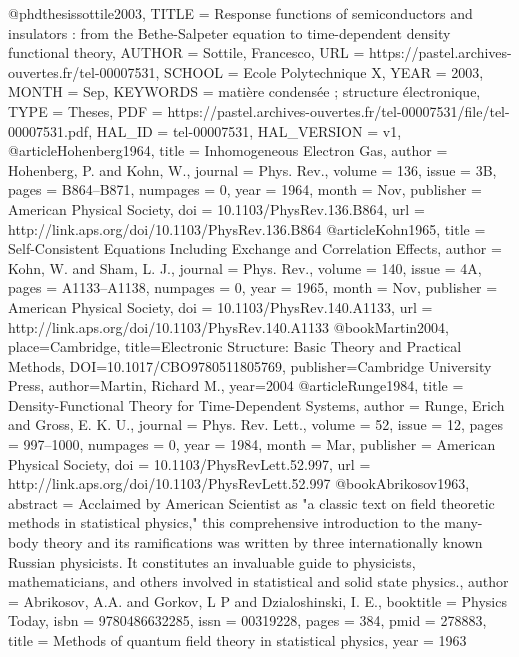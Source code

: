 @phdthesis{sottile2003,
  TITLE = {{Response functions of semiconductors and insulators : from the Bethe-Salpeter equation to time-dependent density functional theory}},
  AUTHOR = {Sottile, Francesco},
  URL = {https://pastel.archives-ouvertes.fr/tel-00007531},
  SCHOOL = {{Ecole Polytechnique X}},
  YEAR = {2003},
  MONTH = Sep,
  KEYWORDS = {mati{\`e}re condens{\'e}e ; structure {\'e}lectronique},
  TYPE = {Theses},
  PDF = {https://pastel.archives-ouvertes.fr/tel-00007531/file/tel-00007531.pdf},
  HAL_ID = {tel-00007531},
  HAL_VERSION = {v1},
}
@article{Hohenberg1964,
  title = {Inhomogeneous Electron Gas},
  author = {Hohenberg, P. and Kohn, W.},
  journal = {Phys. Rev.},
  volume = {136},
  issue = {3B},
  pages = {B864--B871},
  numpages = {0},
  year = {1964},
  month = {Nov},
  publisher = {American Physical Society},
  doi = {10.1103/PhysRev.136.B864},
  url = {http://link.aps.org/doi/10.1103/PhysRev.136.B864}
}
@article{Kohn1965,
  title = {Self-Consistent Equations Including Exchange and Correlation Effects},
  author = {Kohn, W. and Sham, L. J.},
  journal = {Phys. Rev.},
  volume = {140},
  issue = {4A},
  pages = {A1133--A1138},
  numpages = {0},
  year = {1965},
  month = {Nov},
  publisher = {American Physical Society},
  doi = {10.1103/PhysRev.140.A1133},
  url = {http://link.aps.org/doi/10.1103/PhysRev.140.A1133}
}
@book{Martin2004,
  place={Cambridge},
  title={Electronic Structure: Basic Theory and Practical Methods},
  DOI={10.1017/CBO9780511805769},
  publisher={Cambridge University Press},
  author={Martin, Richard M.},
  year={2004}
}
@article{Runge1984,
  title = {Density-Functional Theory for Time-Dependent Systems},
  author = {Runge, Erich and Gross, E. K. U.},
  journal = {Phys. Rev. Lett.},
  volume = {52},
  issue = {12},
  pages = {997--1000},
  numpages = {0},
  year = {1984},
  month = {Mar},
  publisher = {American Physical Society},
  doi = {10.1103/PhysRevLett.52.997},
  url = {http://link.aps.org/doi/10.1103/PhysRevLett.52.997}
}
@book{Abrikosov1963,
abstract = {Acclaimed by American Scientist as "a classic text on field theoretic methods in statistical physics," this comprehensive introduction to the many-body theory and its ramifications was written by three internationally known Russian physicists. It constitutes an invaluable guide to physicists, mathematicians, and others involved in statistical and solid state physics.},
author = {Abrikosov, A.A. and Gorkov, L P and Dzialoshinski, I. E.},
booktitle = {Physics Today},
isbn = {9780486632285},
issn = {00319228},
pages = {384},
pmid = {278883},
title = {{Methods of quantum field theory in statistical physics}},
year = {1963}
}
